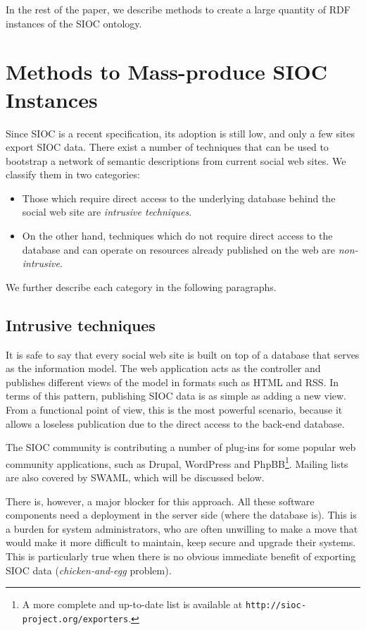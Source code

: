 \documentclass{../templates/www2008-submission}
\begin{document}
In the rest of the paper, we describe methods to create a large
quantity of RDF instances of the SIOC ontology.


\section{\label{sec:taxonomy}Methods to Mass-produce SIOC Instances}

Since SIOC is a recent specification, its adoption is still low, and
only a few sites export SIOC data. There exist a number of techniques
that can be used to bootstrap a network of semantic descriptions from
current social web sites. We classify them in two categories:

\begin{itemize}
\item Those which require direct access to the underlying database behind
the social web site are \emph{intrusive techniques}.
\item On the other hand, techniques which do not require direct access to
the database and can operate on resources already published on the web
are \emph{non-intrusive}.
\end{itemize}

We further describe each category in the following paragraphs.

\subsection{Intrusive techniques}

It is safe to say that every social web site is built on top of a
database that serves as the information model. The web application
acts as the controller and publishes different views of the model in
formats such as HTML and RSS. In terms of this pattern, publishing
SIOC data is as simple as adding a new view.
From a functional point of view, this is the most powerful scenario, because
it allows a loseless publication due to the direct access
to the back-end database.

The SIOC community is contributing a number of plug-ins for some
popular web community applications, such as Drupal, WordPress and 
PhpBB\footnote{A more complete and up-to-date list is available
at \texttt{http://sioc-project.org/exporters}.}. Mailing lists are
also covered by SWAML, which will be discussed below.

There is, however, a major blocker for this approach. All these
software components need a deployment in the server side (where
the database is). This is a burden for system administrators, who
are often unwilling to make a move that would make it more difficult to
maintain, keep secure and upgrade their systems. This is particularly
true when there is no obvious immediate benefit of exporting
SIOC data (\emph{chicken-and-egg} problem).
\end{document}
